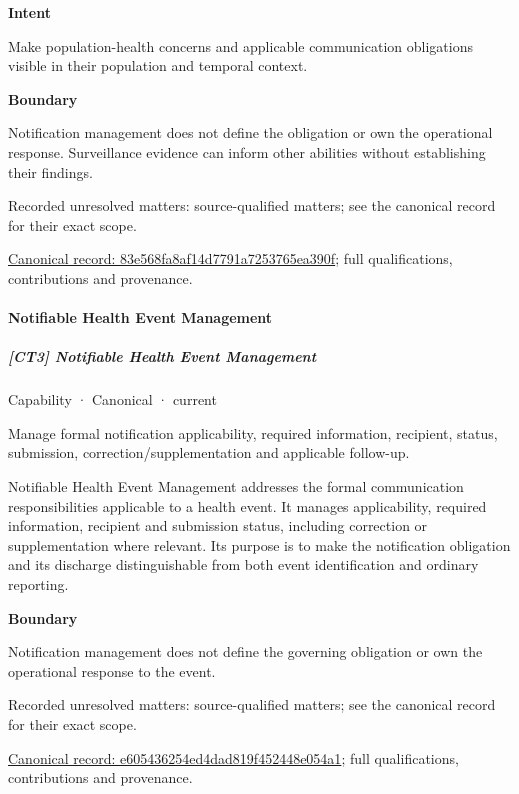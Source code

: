 \textbf{Intent}



Make population-health concerns and applicable communication obligations visible in their population and temporal context.



\textbf{Boundary}



Notification management does not define the obligation or own the operational response. Surveillance evidence can inform other abilities without establishing their findings.


{\small Recorded unresolved matters: source-qualified matters; see the canonical record for their exact scope.}\par
{\footnotesize \href{../../../../continuum/strategy/capability/83e568fa8af14d7791a7253765ea390f.md}{Canonical record: 83e568fa8af14d7791a7253765ea390f}; full qualifications, contributions and provenance.}\par
\paragraph{Notifiable Health Event Management}

\subparagraph{[CT3] Notifiable Health Event Management}

\label{element:e605436254ed4dad819f452448e054a1}
{\small Capability · Canonical · current}\par

Manage formal notification applicability, required information, recipient, status, submission, correction/supplementation and applicable follow-up.



Notifiable Health Event Management addresses the formal communication responsibilities applicable to a health event. It manages applicability, required information, recipient and submission status, including correction or supplementation where relevant. Its purpose is to make the notification obligation and its discharge distinguishable from both event identification and ordinary reporting.



\textbf{Boundary}



Notification management does not define the governing obligation or own the operational response to the event.


{\small Recorded unresolved matters: source-qualified matters; see the canonical record for their exact scope.}\par
{\footnotesize \href{../../../../continuum/strategy/capability/e605436254ed4dad819f452448e054a1.md}{Canonical record: e605436254ed4dad819f452448e054a1}; full qualifications, contributions and provenance.}\par
